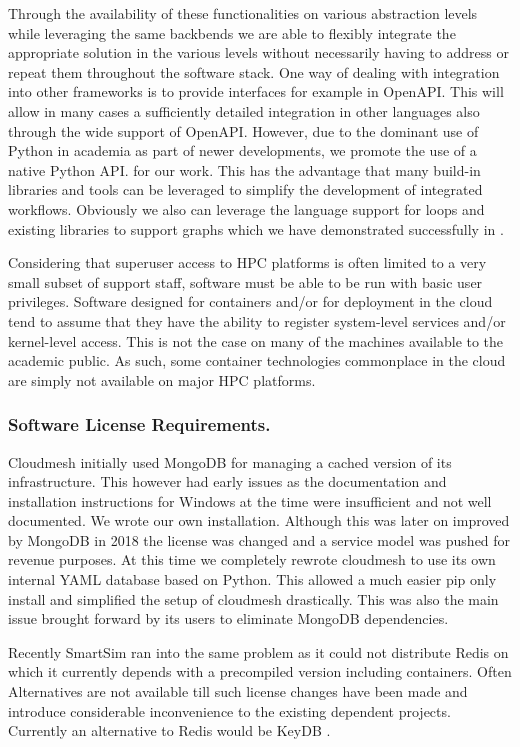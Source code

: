\documentclass[utf8]{FrontiersinVancouver} %
\begin{document}
Through the availability of these functionalities on various abstraction levels while leveraging the same backbends we are able to flexibly integrate the appropriate solution in the various levels without necessarily having to address or repeat them throughout the software stack. One way of dealing with integration into other frameworks is to provide interfaces for example in OpenAPI. This will allow in many cases a sufficiently detailed integration in other languages also through the wide support of OpenAPI. However, due to the dominant use of Python in academia as part of newer developments, we promote the use of a native Python API. for our work. This has the advantage that many build-in libraries and tools can be leveraged to simplify the development of integrated workflows. Obviously we also can leverage the language support for loops and existing libraries to support graphs which we have demonstrated successfully in \citep{cloudmesh-cc}.

Considering that superuser access to HPC platforms is often limited to a very small subset of support staff, software must be able to be run with basic user privileges. Software designed for containers and/or for deployment in the cloud tend to assume that they have the ability to register system-level services and/or kernel-level access. This is not the case on many of the machines available to the academic public. As such, some container technologies commonplace in the cloud are simply not available on major HPC platforms.

\subsubsection{Software License Requirements.} Cloudmesh initially used MongoDB for managing a cached version of its infrastructure. This however had early issues as the documentation and installation instructions for Windows at the time were insufficient and not well documented. We wrote our own installation. Although this was later on improved by MongoDB in 2018 the license was changed and a service model was pushed for revenue purposes. At this time we completely rewrote cloudmesh to use its own internal YAML database based on Python. This allowed 
a much easier pip only install and simplified the setup of cloudmesh drastically. This was also the main issue brought forward by its users to eliminate MongoDB dependencies. 

Recently SmartSim ran into the same problem as it could not distribute Redis on which it currently depends with a precompiled version including containers. Often Alternatives are not available till such license changes have been made and introduce considerable inconvenience to the existing dependent projects. Currently an alternative to Redis would be KeyDB  \citep{keydb}. 
\end{document}
